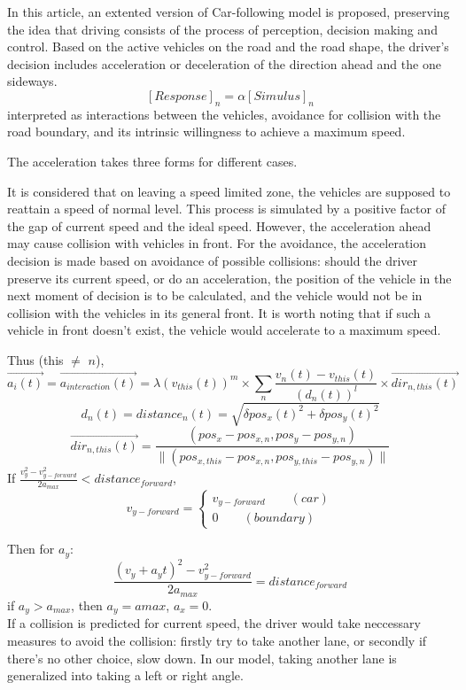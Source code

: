 \documentclass{mcmthesis}
\begin{document}
In this article, an extented version of Car-following model is proposed, preserving the idea that driving consists of the process of perception, decision making and control. Based on the active vehicles on the road and the road shape, the driver's decision includes acceleration or deceleration of the direction ahead and the one sideways.
$$[Response]_n= \alpha [Simulus]_n$$
 interpreted as interactions between the vehicles, avoidance for collision with the road boundary, and its intrinsic willingness to achieve a maximum speed. 

The acceleration takes three forms for different cases.

It is considered that on leaving a speed limited zone, the vehicles are supposed to reattain a speed of normal level. This process is simulated by a positive factor of the gap of current speed and the ideal speed. However, the acceleration ahead may cause collision with vehicles in front. For the avoidance, the acceleration decision is made based on avoidance of possible collisions: should the driver preserve its current speed, or do an acceleration, the position of the vehicle in the next moment of decision is to be calculated, and the vehicle would not be in collision with the vehicles in its general front. It is worth noting that if such a vehicle in front doesn't exist, the vehicle would accelerate to a maximum speed.

Thus (this $\ne$ $n$),
$$\overrightarrow{a_i(t)}=\overrightarrow{a_{interaction}(t)}=\lambda (v_{this}(t))^m \times \sum_n\frac{v_n(t)-v_{this}(t)}{(d_n(t))^l}\times \overrightarrow{dir_{n,this}(t)}$$
$$d_{n}(t)=distance_n(t)=\sqrt{\delta pos_x(t)^2+\delta pos_y(t)^2}$$
$$\overrightarrow{dir_{n,this}(t)}=\frac{(pos_x-pos_{x,n},pos_y-pos_{y,n})}{\parallel (pos_{x,this}-pos_{x,n},pos_{y,this}-pos_{y,n}) \parallel} $$
If $\frac{v_y^2-v_{y-forward}^2}{2a_{max}}<distance_{forward}$,
$$v_{y-forward}= \left\{ 
\begin{aligned}
v_{y-forward} \qquad (car)\\
0 \qquad (boundary)
\end{aligned}
\right.
$$

Then for $a_y$:
$$\frac{(v_y+a_yt)^2-v_{y-forward}^2}{2a_{max}}=distance_{forward}$$
if $a_y>a_{max}$, then $a_y=a{max}$, $a_x=0$.\\

If a collision is predicted for current speed, the driver would take neccessary measures to avoid the collision: firstly try to take another lane, or secondly if there's no other choice, slow down. In our model, taking another lane is generalized into taking a left or right angle.
\end{document}

